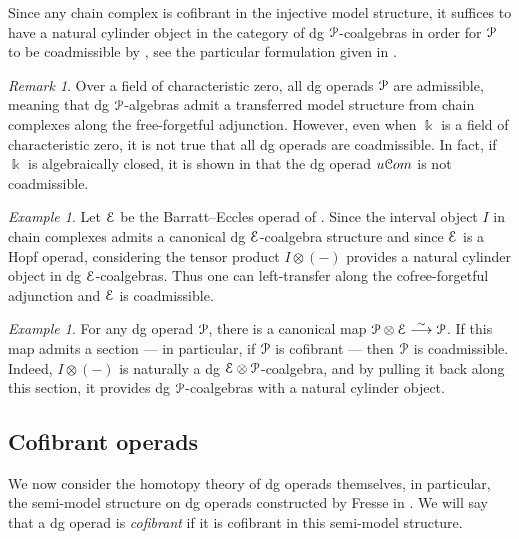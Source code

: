 \documentclass[a4paper,12pt]{amsart}
\renewcommand{\mathcal}{\EuScript}
\newcommand{\oneop}{\mathcal{P}}
\theoremstyle{plain}
\theoremstyle{definition}
\theoremstyle{remark}
\newtheorem{remark}[theorem]{\sc Remark}%
\newtheorem{example}[theorem]{\sc Example}%
\newcommand{\kk}{\Bbbk}
\begin{document}
Since any chain complex is cofibrant in the injective model structure, it suffices to have a natural cylinder object in the category of dg $\oneop$-coalgebras in order for $\oneop$ to be coadmissible by \cite{BHKKRS, HKRS}, see the particular formulation given in \cite[Appendix B]{premierpapier}. 
 
\begin{remark}
Over a field of characteristic zero, all dg operads $\oneop$ are admissible, meaning that dg $\oneop$-algebras admit a transferred model structure from chain complexes along the free-forgetful adjunction. However, even when $\kk$ is a field of characteristic zero, it is not true that all dg operads are coadmissible. In fact, if $\kk$ is algebraically closed, it is shown in \cite[Proposition 8.10]{linearcoalgebras} that the dg operad $u\mathcal{C}om$ is not coadmissible.
\end{remark}

\begin{example}
Let $\mathcal{E}$ be the Barratt--Eccles operad of \cite{BergerFresse}. Since the interval object $I$ in chain complexes admits a canonical dg $\mathcal{E}$-coalgebra structure and since $\mathcal{E}$ is a Hopf operad, considering the tensor product $I \otimes (-)$ provides a natural cylinder object in dg $\mathcal{E}$-coalgebras. Thus one can left-transfer along the cofree-forgetful adjunction and $\mathcal{E}$ is coadmissible. 
\end{example}

\begin{example}\label{ex:cofibrant is coadmissible}
For any dg operad $\oneop$, there is a canonical map $\oneop \otimes \mathcal{E} \stackrel\sim\longrightarrow \oneop$. If this map admits a section --- in particular, if $\oneop$ is cofibrant --- then $\oneop$ is coadmissible. Indeed, $I \otimes (-)$ is naturally a dg $\mathcal{E} \otimes \oneop$-coalgebra, and by pulling it back along this section, it provides dg $\oneop$-coalgebras with a natural cylinder object. 
\end{example}

\subsection{Cofibrant operads}
We now consider the homotopy theory of dg operads themselves, in particular, the semi-model structure on dg operads constructed by Fresse in \cite[Chapter 12]{Fresse09}. We will say that a dg operad is \textit{cofibrant} if it is cofibrant in this semi-model structure. 
\end{document}
